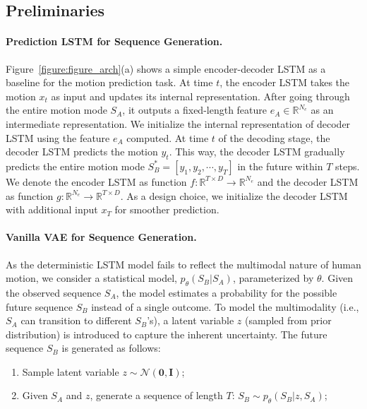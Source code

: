 \documentclass[runningheads]{llncs}
\newcommand{\cutsubsectionup}{\vspace*{-0.1in}}
\newcommand{\cutsubsectiondown}{\vspace*{-0.07in}}
\begin{document}
\cutsubsectionup
\subsection{Preliminaries}
\label{sec:preliminaries}
\cutsubsectiondown

\paragraph{Prediction LSTM for Sequence Generation.}
Figure~\ref{figure:figure_arch}(a) shows a simple encoder-decoder LSTM \cite{hochreiter1997long,srivastava2015unsupervised} as a baseline for the motion prediction task.
At time $t$, the encoder LSTM takes the motion $x_t$ as input and updates its internal representation.
After going through the entire motion mode $S_A$, it outputs a fixed-length feature $e_A \in \mathbb{R}^{N_e}$ as an intermediate representation.
We initialize the internal representation of decoder LSTM using the feature $e_A$ computed.
At time $t$ of the decoding stage, the decoder LSTM predicts the motion $y_t$.
This way, the decoder LSTM gradually predicts the entire motion mode $S^*_B = [y_1, y_2, \cdots, y_T]$ in the future within $T$ steps.
We denote the encoder LSTM as function $f: \mathbb{R}^{T\times D} \rightarrow \mathbb{R}^{N_e}$ and the decoder LSTM as function $g: \mathbb{R}^{N_e} \rightarrow \mathbb{R}^{T\times D}$.
As a design choice, we initialize the decoder LSTM with additional input $x_T$ for smoother prediction.


\vspace*{-0.1in}
\paragraph{Vanilla VAE for Sequence Generation.}
As the deterministic LSTM model fails to reflect the multimodal nature of human motion, we consider a statistical model, $p_\theta(S_B|S_A)$, parameterized by $\theta$.
Given the observed sequence $S_A$, the model estimates a probability for the possible future sequence $S_B$ instead of a single outcome.
To model the multimodality (i.e., $S_A$ can transition to different $S_B$'s), a latent variable $z$ (sampled from prior distribution) is introduced to capture the inherent uncertainty.
The future sequence $S_B$ is generated as follows:
\begin{enumerate}
\item Sample latent variable $z \sim \mathcal{N}(\mathbf{0}, \mathbf{I})$;
\item Given $S_A$ and $z$, generate a sequence of length $T$: $S_B\sim p_\theta(S_B|z, S_A)$; 
\vspace*{-0.2cm}
\end{enumerate}
\end{document}
